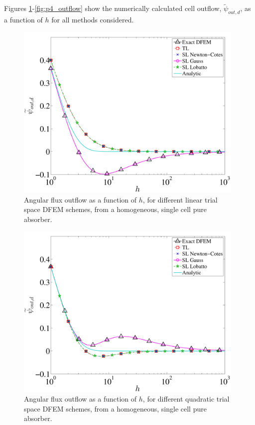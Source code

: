 Figures \ref{fig:p1_outflow}-\ref{fig:p4_outflow} show the numerically calculated cell outflow, $\widetilde{\psi}_{out,d}$, as a function 
of $h$ for all methods considered. 
\begin{figure}[!htp]
\centering
\includegraphics[width=11cm]{chapter2_constant_xs/P1_Outflow_AllMeth-eps-converted-to.pdf}
\caption{Angular flux outflow as a function of $h$, for different linear trial space DFEM schemes, from a homogeneous, single cell pure absorber.}
\label{fig:p1_outflow}
\end{figure}
\begin{figure}[!hbp]
\centering
\includegraphics[width=11cm]{chapter2_constant_xs/P2_Outflow_AllMeth-eps-converted-to.pdf}
\caption{Angular flux outflow as a function of $h$, for different quadratic trial space DFEM schemes, from a homogeneous, single cell pure absorber.}
\label{fig:p2_outflow}
\end{figure}
